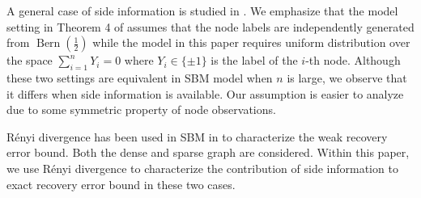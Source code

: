 \documentclass[conference]{IEEEtran}
\DeclareMathOperator{\Bern}{Bern}
\begin{document}
A general case of side information is studied
in \cite{abbe17sideinfo}. We emphasize that the model setting in Theorem 4 of \cite{abbe17sideinfo}
assumes that the node labels are independently generated  from $\Bern(\frac{1}{2})$ while the model
in this paper requires uniform distribution over the space $\sum_{i=1}^n Y_i = 0$ where $Y_i \in \{\pm 1 \}$ is the label of the $i$-th node.
Although these two settings are equivalent in
SBM model when $n$ is large, we observe that it differs when side information is available. Our assumption is easier to analyze due to some
symmetric property of node observations.

Rényi divergence has been used in SBM in \cite{zhang2016} to characterize the weak recovery error bound. Both the dense and sparse graph are considered.
Within this paper, we use Rényi divergence to characterize
the contribution of side information to exact recovery error bound in these two cases.
\end{document}
